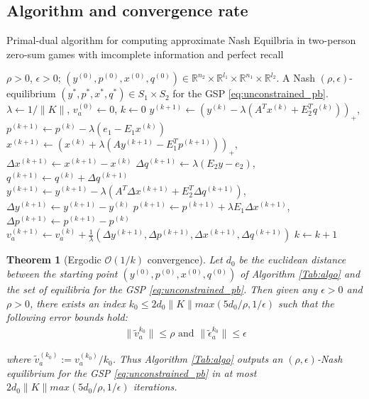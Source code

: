 \documentclass{article} %
\newtheorem{theorem}{Theorem} \newtheorem{lemma}[theorem]{Lemma}
\begin{document}
\subsection{Algorithm and convergence rate}
\begin{algorithm}
\caption{Primal-dual algorithm for computing approximate Nash
  Equilbria in two-person zero-sum games with imcomplete information
  and perfect recall}
\label{Tab:algo}
\begin{algorithmic}[1]
\Require $\rho >0$, $\epsilon > 0$; $(y^{(0)},p^{(0)},x^{(0)},q^{(0)})
\in \mathbb{R}^{n_2}
  \times \mathbb{R}^{l_1} \times \mathbb{R}^{n_1} \times
  \mathbb{R}^{l_2}$.
\Ensure A Nash $(\rho, \epsilon)$-equilibrium
$({y^*},{p^*},{x^*},{q^*}) \in S_1 \times S_2$ for
the GSP \eqref{eq:unconstrained_pb}.
\State  $\lambda \leftarrow 1/\|K\|$, ${v}_a^{(0)} \leftarrow 0$, $k
\leftarrow 0$
\State $y^{(k + 1)} \leftarrow (y^{(k)} - \lambda (A^Tx^{(k)} +
E_2^Tq^{(k)}))_+$, \hspace{.5em}$p^{(k+1)} \leftarrow p^{(k)} -
\lambda(e_1-E_1x^{(k)})$
\State $x^{(k + 1)} \leftarrow (x^{(k)} + \lambda (Ay^{(k+1)} -
E_1^Tp^{(k+1)}))_+$, \hspace{.5em}$\Delta x^{(k+1)} \leftarrow
x^{(k+1)}-x^{(k)}$
\State $\Delta q^{(k+1)} \leftarrow \lambda (E_2y -
e_2)$, \hspace{.5em}$q^{(k+1)} \leftarrow q^{(k)} + \Delta q^{(k+1)}$
\State $y^{(k+1)} \leftarrow y^{(k+1)} - \lambda (A^T\Delta x^{(k+1)}
+ E_2^T\Delta q^{(k+1)})$, \hspace{.5em}$\Delta y^{(k+1)} \leftarrow
y^{(k+1)}-y^{(k)}$
\State $p^{(k+1)} \leftarrow p^{(k+1)} + \lambda E_1\Delta x^{(k+1)}$,
\hspace{.5em} $\Delta p^{(k+1)} \leftarrow p^{(k+1)}-p^{(k)}$
\State ${v}_a^{(k+1)} \leftarrow {v}_a^{(k)} +
\frac{1}{\lambda}(\Delta
y^{(k+1)},\Delta p^{(k+1)},\Delta x^{(k+1)},\Delta q^{(k+1)})$
\State $k \leftarrow k + 1$
\EndWhile
\end{algorithmic}
\end{algorithm}

\begin{theorem}[Ergodic $\mathcal{O}(1/k)$ convergence]
Let $d_0$ be the euclidean distance between the starting point
$(y^{(0)},p^{(0)},x^{(0)},q^{(0)})$ of Algorithm \ref{Tab:algo} and the
set of equilibria for the GSP \eqref{eq:unconstrained_pb}.
Then given any $\epsilon > 0$ and $\rho > 0$, there exists an index
$k_0 \le 2d_0\|K\|max(5d_0/\rho, 1/\epsilon)$ such that the following
error bounds hold:
\begin{eqnarray}
\|\tilde{v}_a^{k_0}\| \le \rho \text{ and }
\|\tilde{\epsilon}_a^{k_0}\| \le \epsilon
\end{eqnarray}

where $\tilde{v}_a^{(k_0)} := v_a^{(k_0)}/k_0$.
Thus Algorithm \ref{Tab:algo} outputs an $(\rho,\epsilon)$-Nash
equilibrium for the GSP \eqref{eq:unconstrained_pb}
in at most $2d_0\|K\|max(5d_0/\rho, 1/\epsilon)$ iterations.
\end{theorem}
\end{document}
